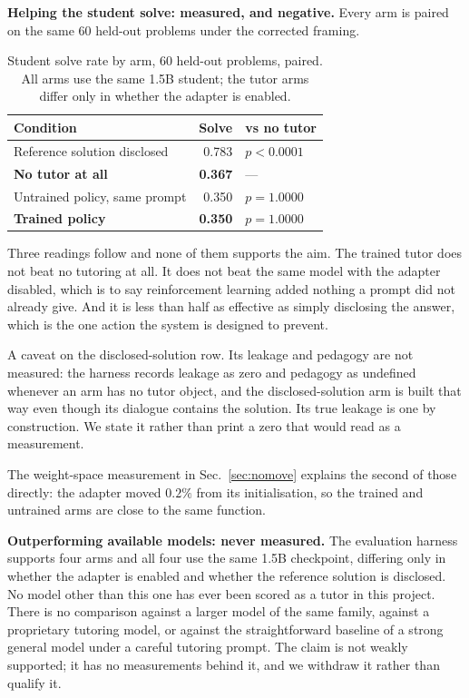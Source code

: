 \textbf{Helping the student solve: measured, and negative.} Every arm is paired
on the same 60 held-out problems under the corrected framing.

\begin{table}[t]
\caption{Student solve rate by arm, 60 held-out problems, paired. All arms use
the same 1.5B student; the tutor arms differ only in whether the adapter is
enabled.}
\label{tab:claims}
\centering
\small
\begin{tabular}{lrl}
\toprule
\textbf{Condition} & \textbf{Solve} & \textbf{vs no tutor} \\
\midrule
Reference solution disclosed      & 0.783 & $p<0.0001$ \\
\textbf{No tutor at all}          & \textbf{0.367} & --- \\
Untrained policy, same prompt     & 0.350 & $p{=}1.0000$ \\
\textbf{Trained policy}           & \textbf{0.350} & $p{=}1.0000$ \\
\bottomrule
\end{tabular}
\end{table}

Three readings follow and none of them supports the aim. The trained tutor does
not beat no tutoring at all. It does not beat the same model with the adapter
disabled, which is to say reinforcement learning added nothing a prompt did not
already give. And it is less than half as effective as simply disclosing the
answer, which is the one action the system is designed to prevent.

A caveat on the disclosed-solution row. Its leakage and pedagogy are not
measured: the harness records leakage as zero and pedagogy as undefined
whenever an arm has no tutor object, and the disclosed-solution arm is built
that way even though its dialogue contains the solution. Its true leakage is
one by construction. We state it rather than print a zero that would read as a
measurement.

The weight-space measurement in Sec.~\ref{sec:nomove} explains the second of
those directly: the adapter moved $0.2\%$ from its initialisation, so the
trained and untrained arms are close to the same function.

\textbf{Outperforming available models: never measured.} The evaluation harness
supports four arms and all four use the same 1.5B checkpoint, differing only in
whether the adapter is enabled and whether the reference solution is disclosed.
No model other than this one has ever been scored as a tutor in this project.
There is no comparison against a larger model of the same family, against a
proprietary tutoring model, or against the straightforward baseline of a strong
general model under a careful tutoring prompt. The claim is not weakly
supported; it has no measurements behind it, and we withdraw it rather than
qualify it.

